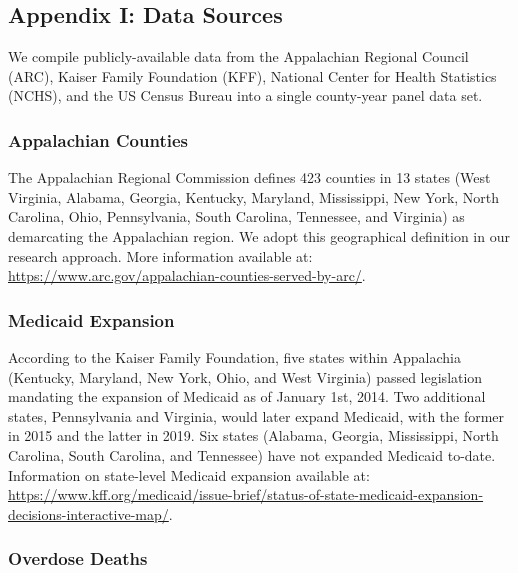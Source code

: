 \documentclass[
  11pt,
]{article}
\begin{document}
\hypertarget{appendix-i-data-sources}{%
\subsection{Appendix I: Data Sources}\label{appendix-i-data-sources}}

We compile publicly-available data from the Appalachian Regional Council
(ARC), Kaiser Family Foundation (KFF), National Center for Health
Statistics (NCHS), and the US Census Bureau into a single county-year
panel data set.

\hypertarget{appalachian-counties}{%
\subsubsection{Appalachian Counties}\label{appalachian-counties}}

The Appalachian Regional Commission defines 423 counties in 13 states
(West Virginia, Alabama, Georgia, Kentucky, Maryland, Mississippi, New
York, North Carolina, Ohio, Pennsylvania, South Carolina, Tennessee, and
Virginia) as demarcating the Appalachian region. We adopt this
geographical definition in our research approach. More information
available at:
\url{https://www.arc.gov/appalachian-counties-served-by-arc/}.

\hypertarget{medicaid-expansion}{%
\subsubsection{Medicaid Expansion}\label{medicaid-expansion}}

According to the Kaiser Family Foundation, five states within Appalachia
(Kentucky, Maryland, New York, Ohio, and West Virginia) passed
legislation mandating the expansion of Medicaid as of January 1st, 2014.
Two additional states, Pennsylvania and Virginia, would later expand
Medicaid, with the former in 2015 and the latter in 2019. Six states
(Alabama, Georgia, Mississippi, North Carolina, South Carolina, and
Tennessee) have not expanded Medicaid to-date. Information on
state-level Medicaid expansion available at:
\url{https://www.kff.org/medicaid/issue-brief/status-of-state-medicaid-expansion-decisions-interactive-map/}.

\hypertarget{overdose-deaths}{%
\subsubsection{Overdose Deaths}\label{overdose-deaths}}
\end{document}
